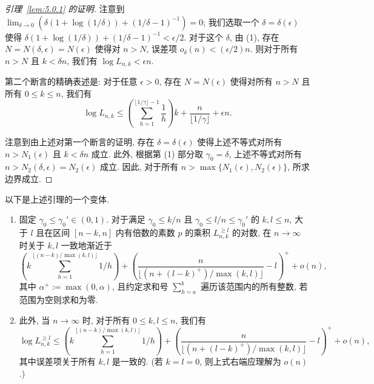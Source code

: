 \begin{proof}[引理~\ref{lem:5.0.1} 的证明]
注意到 $\lim_{\delta\to 0} \left( \delta(1+\log(1/\delta)) + (1/\delta-1)^{-1} \right) = 0$; 我们选取一个 $\delta = \delta(\epsilon)$ 使得 $\delta(1+\log(1/\delta)) + (1/\delta-1)^{-1} < \epsilon/2$.
对于这个 $\delta$, 由 (1), 存在 $N = N(\delta,\epsilon) = N(\epsilon)$ 使得对 $n > N$, 误差项 $o_{\delta}(n) < (\epsilon/2)n$.
则对于所有 $n > N$ 且 $k < \delta n$, 我们有 $\log L_{n,k} < \epsilon n$.

第二个断言的精确表述是: 对于任意 $\epsilon > 0$, 存在 $N = N(\epsilon)$ 使得对所有 $n > N$ 且所有 $0 \le k \le n$, 我们有
\[ \log L_{n,k} \le \left(\sum_{h=1}^{\lfloor 1/\gamma \rfloor - 1} \frac{1}{h}\right) k + \frac{n}{\lfloor 1/\gamma \rfloor} + \epsilon n. \]

注意到由上述对第一个断言的证明, 存在 $\delta = \delta(\epsilon)$ 使得上述不等式对所有 $n > N_1(\epsilon)$ 且 $k < \delta n$ 成立.
此外, 根据第 (1) 部分取 $\gamma_0 = \delta$, 上述不等式对所有 $n > N_2(\delta, \epsilon) = N_2(\epsilon)$ 成立.
因此, 对于所有 $n > \max\{N_1(\epsilon), N_2(\epsilon)\}$, 所求边界成立.
\end{proof}

以下是上述引理的一个变体.

\begin{lemma}\label{lem:5.0.4}
\quad
\begin{enumerate}
  \item[(1)] 固定 $\gamma_0 \leq \gamma_0' \in (0,1)$. 对于满足 $\gamma_0 \leq k/n$ 且 $\gamma_0 \leq l/n \leq \gamma_0'$ 的 $k, l \leq n$, 大于 $l$ 且在区间 $[n-k, n]$ 内有倍数的素数 $p$ 的乘积 $L_{n,k}^{\geq l}$ 的对数, 在 $n \to \infty$ 时关于 $k, l$ 一致地渐近于
  \[ \left(k\sum_{h=1}^{\lfloor (n-k)/\max(k,l)\rfloor} 1/h\right) + \left(\frac{n}{\lfloor (n+(l-k)^+)/\max(k,l)\rfloor} - l\right)^+ + o(n), \]
  其中 $\alpha^+ := \max(0, \alpha)$, 且约定求和号 $\sum_{h=a}^b$ 遍历该范围内的所有整数, 若范围为空则求和为零.
  
  \item[(2)] 此外, 当 $n \to \infty$ 时, 对于所有 $0 \le k, l \le n$, 我们有
  \[ \log L_{n,k}^{\geq l} \le \left(k \sum_{h=1}^{\lfloor (n-k)/\max(k,l)\rfloor} 1/h\right) + \left(\frac{n}{\lfloor (n+(l-k)^+)/\max(k,l)\rfloor} - l\right)^+ + o(n), \]
  其中误差项关于所有 $k, l$ 是一致的. (若 $k = l = 0$, 则上式右端应理解为 $o(n)$.)
\end{enumerate}
\end{lemma}

